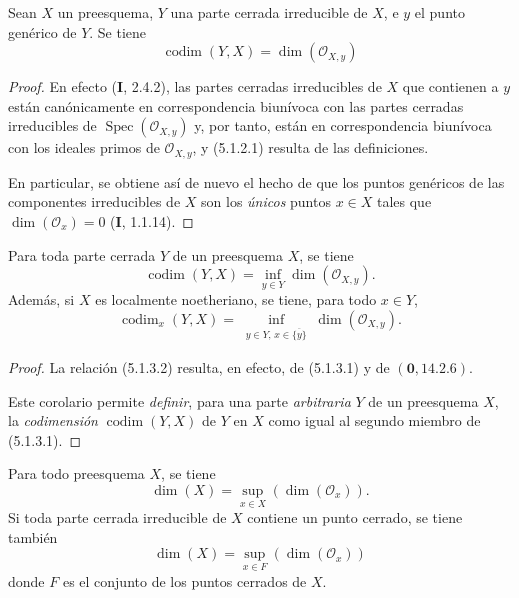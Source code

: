 \begin{proposition}[5.1.2]
\label{IV.2.5.1.2-fr}
Sean $X$ un preesquema, $Y$ una parte cerrada irreducible de $X$, e $y$ el
punto genérico de $Y$. Se tiene
\begin{equation}
\operatorname{codim}(Y,X)=\dim(\mathcal O_{X,y})
\tag{5.1.2.1}\label{IV.2.5.1.2.1-fr}
\end{equation}
\end{proposition}

\begin{proof}
En efecto (\textbf I, 2.4.2), las partes cerradas irreducibles de $X$ que contienen a
$y$ están canónicamente en correspondencia biunívoca con las partes cerradas
irreducibles de $\operatorname{Spec}(\mathcal O_{X,y})$ y, por tanto, están en
correspondencia biunívoca con los ideales primos de $\mathcal O_{X,y}$, y
(5.1.2.1) resulta de las definiciones.

En particular, se obtiene así de nuevo el hecho de que los puntos genéricos de
las componentes irreducibles de $X$ son los \emph{únicos} puntos $x\in X$ tales
que $\dim(\mathcal O_x)=0$ (\textbf I, 1.1.14).
\end{proof}


\begin{corollary}[5.1.3]
\label{IV.2.5.1.3-fr}
Para toda parte cerrada $Y$ de un preesquema $X$, se tiene
\begin{equation}
\operatorname{codim}(Y,X)=\inf_{y\in Y}\dim(\mathcal O_{X,y}).
\tag{5.1.3.1}\label{IV.2.5.1.3.1-fr}
\end{equation}
Además, si $X$ es localmente noetheriano, se tiene, para todo $x\in Y$,
\begin{equation}
\operatorname{codim}_x(Y,X)=
\inf_{\substack{y\in Y,\,x\in\overline{\{y\}}}}
\dim(\mathcal O_{X,y}).
\tag{5.1.3.2}\label{IV.2.5.1.3.2-fr}
\end{equation}
\end{corollary}

\begin{proof}
La relación (5.1.3.2) resulta, en efecto, de (5.1.3.1) y de $(\mathbf{0},14.2.6)$.

Este corolario permite \emph{definir}, para una parte \emph{arbitraria} $Y$ de
un preesquema $X$, la \emph{codimensión} $\operatorname{codim}(Y,X)$ de $Y$ en
$X$ como igual al segundo miembro de (5.1.3.1).
\end{proof}

\begin{proposition}[5.1.4]
\label{IV.2.5.1.4-fr}
Para todo preesquema $X$, se tiene
\begin{equation}
\dim(X)=\sup_{x\in X}(\dim(\mathcal O_x)).
\tag{5.1.4.1}\label{IV.2.5.1.4.1-fr}
\end{equation}
Si toda parte cerrada irreducible de $X$ contiene un punto cerrado, se tiene
también
\begin{equation}
\dim(X)=\sup_{x\in F}(\dim(\mathcal O_x))
\tag{5.1.4.2}\label{IV.2.5.1.4.2-fr}
\end{equation}
donde $F$ es el conjunto de los puntos cerrados de $X$.
\end{proposition}

